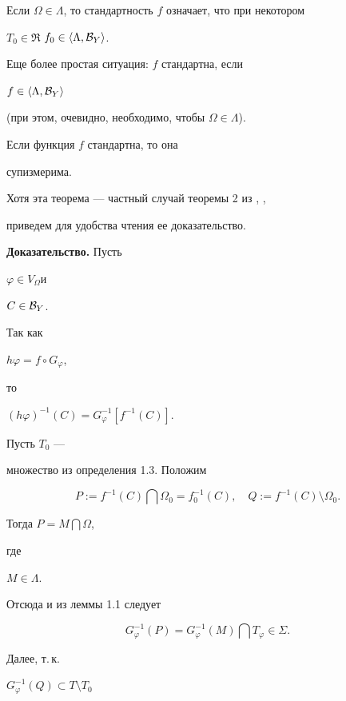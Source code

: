 Если $\Omega\in\Lambda$, то стандартность $f$ означает, что при некотором


$T_0\in\Re$ $f_0\in\langle \Lambda ,{\cal B}_Y\rangle $.


Еще более простая ситуация: $f$ стандартна, если


$f\in\langle \Lambda ,{\cal B}_Y\rangle$


(при этом, очевидно, необходимо, чтобы $\Omega\in\Lambda$).





\begin{thms} Если функция $f$ стандартна, то она


супизмерима.


\end{thms}





Хотя эта теорема --- частный случай теоремы 2 из \cite{Sh1}, \cite{Sh2},


приведем для удобства чтения ее доказательство.





{\bf Доказательство.} Пусть


$\varphi\in V_\Omega$и


$C\in{\cal B}_Y$.


Так как


$h\varphi=f\circ G_\varphi$,


то


$(h\varphi)^{-1}(C)=G_{\varphi}^{-1}[f^{-1}(C)]$.


Пусть $T_0$ ---


множество из определения 1.3. Положим


$$


P := f^{-1}(C)\bigcap\Omega _0=f_0^{-1}(C),\quad


Q := f^{-1}(C)\setminus\Omega _0.


$$


Тогда $P=M\bigcap\Omega$,


где


$M\in\Lambda$.


Отсюда и из леммы 1.1 следует


$$


G_\varphi^{-1}(P)=G_\varphi^{-1}(M)\bigcap T_\varphi\in\Sigma.


$$


Далее, т.\,к.


$G_\varphi^{-1}(Q)\subset T\setminus T_0$


